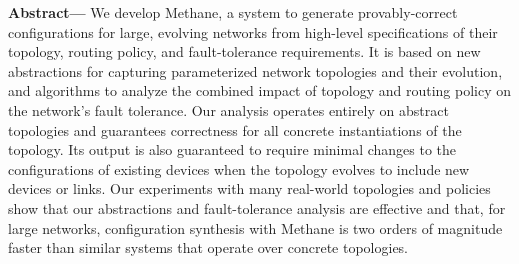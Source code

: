 \documentclass[numbers, 10pt, preprint]{sigplanconf}
\newcommand{\ryan}[1]{\textcolor{green}{[ryan: #1]}}
\newcommand{\sysname}{{\small \sf Methane}\xspace}
\begin{document}
\textbf{Abstract---}
We develop \sysname, a system to generate provably-correct configurations for large, evolving networks from high-level specifications of their topology, routing policy, and fault-tolerance requirements. It is based on new abstractions for capturing parameterized network topologies and their evolution, and algorithms to analyze the combined impact of topology and routing policy on the network's fault tolerance. Our analysis operates entirely on abstract topologies and guarantees correctness for all concrete instantiations of the topology. Its output is also guaranteed to require minimal changes to the configurations of existing devices when the topology evolves to include new devices or links. Our experiments with many real-world topologies and policies show that our abstractions and fault-tolerance analysis are effective and that, for large networks, configuration synthesis with \sysname is two orders of magnitude faster than similar systems that operate over concrete topologies.

\end{document}

